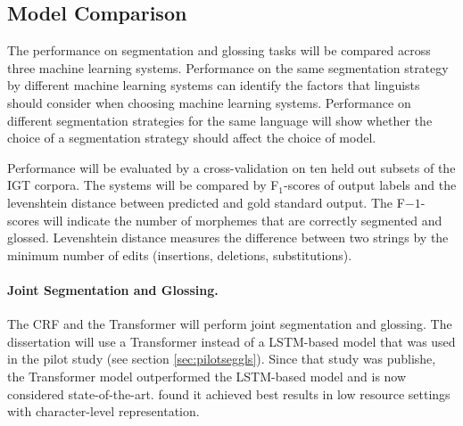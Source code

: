 \subsection{Model Comparison}

The performance on segmentation and glossing tasks will be compared across three machine learning systems.  Performance on the same segmentation strategy by different machine learning systems can identify the factors that linguists should consider when choosing machine learning systems. Performance on different segmentation strategies for the same language will show whether the choice of a segmentation strategy should affect the choice of model.  

Performance will be evaluated by a cross-validation on ten held out subsets of the IGT corpora. The systems will be compared by F$_1$-scores of output labels and the levenshtein distance between predicted and gold standard output. 
The F$-1$-scores will indicate the number of morphemes that are correctly segmented and glossed. Levenshtein distance measures the difference between two strings by the minimum number of edits (insertions, deletions, substitutions). 

\paragraph{Joint Segmentation and Glossing.}
The CRF and the Transformer will perform joint segmentation and glossing. The dissertation will use a Transformer instead of a LSTM-based model that was used in the pilot study (see section \ref{sec:pilotseggls}). Since that study was publishe, the Transformer model outperformed the LSTM-based model and is now considered state-of-the-art. \cite{wu2020applying} found it achieved best results in low resource settings with character-level representation. 


